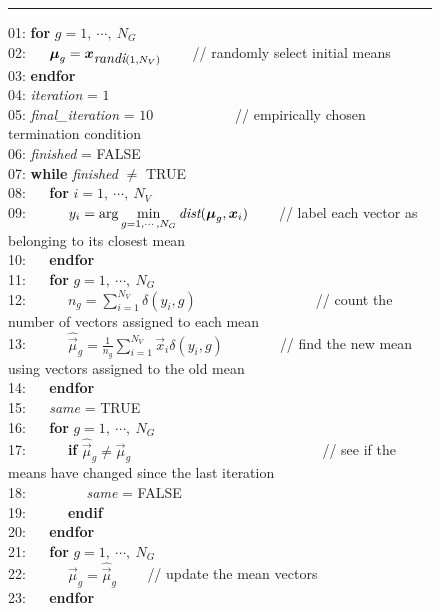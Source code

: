 \begin{figure}[!b]
\hrule
\vspace{0.5ex}
\begin{small}
\begin{tabbing}
01: {\bf for} $g=1, ~\cdots, ~N_G$ \\
02: ~~ $\Vec{\mu}_g = \Vec{x}_{ \mbox{\it randi}(1, N_V) } $ ~~~ {\small // randomly select initial means} \\
03: {\bf endfor} \\
04: {\it iteration} = $1$ \\
05: {\it final\_iteration} = $10$ ~~~ ~~~ ~~~ {\small // empirically chosen termination condition} \\
06: {\it finished} = FALSE \\
07: {\bf while} {\it finished} $\neq$ TRUE \\
08: ~~ {\bf for} $i=1, ~\cdots, ~N_V$ \\
09: ~~ ~~ \( y_i = {\displaystyle \arg \min_{g=1, \cdots, N_G}} \operatorname{\mbox{\it dist}}(\Vec{\mu}_g, \Vec{x}_i) \) ~~~ {\small // label each vector as belonging to its closest mean} \\
10: ~~ {\bf endfor} \\
11: ~~ {\bf for} $g=1, ~\cdots, ~N_G$ \\
12: ~~ ~~ $n_g = \sum\nolimits_{i=1}^{N_V} \delta(y_i, g) $  ~~~ ~~~ ~~~ ~~~ ~ {\small // count the number of vectors assigned to each mean} \\
13: ~~ ~~ $\widehat{\Vec{\mu}}_g = \frac{1}{n_g} \sum\nolimits_{i=1}^{N_V} \Vec{x}_i \delta(y_i, g) $ ~~~ ~~~ {\small // find the new mean using vectors assigned to the old mean} \\
14: ~~ {\bf endfor} \\
15: ~~ {\it same} = TRUE \\
16: ~~ {\bf for} $g=1, ~\cdots, ~N_G$ \\
17: ~~ ~~ {\bf if} $\widehat{\Vec{\mu}}_g \neq \Vec{\mu}_g $  ~~~ ~~~ ~~~ ~~~ ~~~ ~~~ ~~~~ {\small // see if the means have changed since the last iteration} \\
18: ~~ ~~ ~~ {\it same} = FALSE \\
19: ~~ ~~ {\bf endif} \\
20: ~~ {\bf endfor} \\
21: ~~ {\bf for} $g=1, ~\cdots, ~N_G$ \\
22: ~~ ~~ $\Vec{\mu}_g = \widehat{\Vec{\mu}}_g$ ~~~ {\small // update the mean vectors} \\
23: ~~ {\bf endfor} \\

\end{tabbing}
\end{small}
\end{figure}
